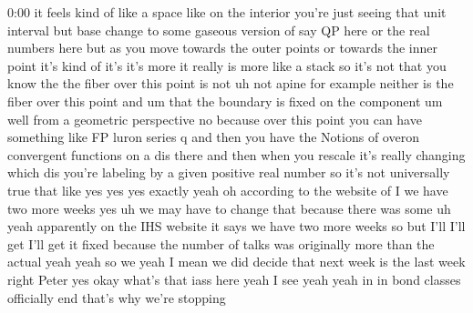 \begin{unfinished}{0:00}
it  feels  kind  of  like  a  space  like  on
the  interior  you're  just  seeing  that
unit  interval  but  base  change  to  some
gaseous  version  of  say  QP  here  or  the
real  numbers  here  but  as  you  move
towards  the  outer  points  or  towards  the
inner  point  it's  kind  of  it's  it's  more
it  really  is  more  like  a  stack  so  it's
not  that  you  know  the  the  fiber  over
this  point  is  not  uh  not  apine  for
example  neither  is  the  fiber  over  this
point
and  um  that  the  boundary  is
fixed  on  the  component
um
well  from  a  geometric  perspective  no
because  over  this  point  you  can  have
something  like
FP  luron  series  q  and  then  you  have  the
Notions  of  overon  convergent  functions
on  a  dis  there  and  then  when  you  rescale
it's  really  changing  which  dis  you're
labeling  by  a  given  positive  real  number
so  it's  not  universally  true  that
like  yes  yes  yes  exactly
yeah
oh  according  to  the  website  of  I  we  have
two  more  weeks  yes  uh  we  may  have  to
change
that  because  there  was  some  uh
yeah  apparently  on  the  IHS  website  it
says  we  have  two  more  weeks  so  but  I'll
I'll  get  I'll  get  it  fixed  because  the
number  of  talks  was  originally  more  than
the  actual  yeah  yeah  so  we
yeah  I  mean  we  did  decide  that  next  week
is  the  last  week  right  Peter
yes
okay  what's
that  iass
here  yeah  I  see  yeah  yeah  in  in  bond
classes  officially  end  that's  why  we're
stopping
\end{unfinished}